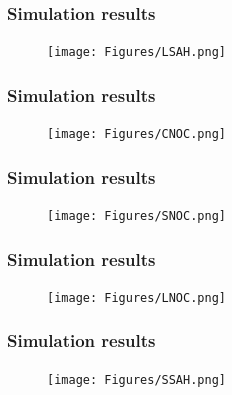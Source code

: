 \begin{frame}
	\frametitle{Simulation results} \footnotesize
	\begin{center}
		\begin{figure}
			\texttt{[image: Figures/LSAH.png]}\\
		\end{figure}
		\scriptsize{ \color{blue}{}}
	\end{center}
\end{frame}
\begin{frame}
	\frametitle{Simulation results} \footnotesize
	\begin{center}
		\begin{figure}
			\texttt{[image: Figures/CNOC.png]}\\
		\end{figure}
		\scriptsize{ \color{blue}{}}
	\end{center}
\end{frame}
\begin{frame}
	\frametitle{Simulation results} \footnotesize
	\begin{center}
		\begin{figure}
			\texttt{[image: Figures/SNOC.png]}\\
		\end{figure}
		\scriptsize{ \color{blue}{}}
	\end{center}
\end{frame}
\begin{frame}
	\frametitle{Simulation results} \footnotesize
	\begin{center}
		\begin{figure}
			\texttt{[image: Figures/LNOC.png]}\\
		\end{figure}
		\scriptsize{ \color{blue}{}}
	\end{center}
\end{frame}
\begin{frame}
	\frametitle{Simulation results} \footnotesize
	\begin{center}
		\begin{figure}
			\texttt{[image: Figures/SSAH.png]}\\
		\end{figure}
		\scriptsize{ \color{blue}{}}
	\end{center}
\end{frame}
